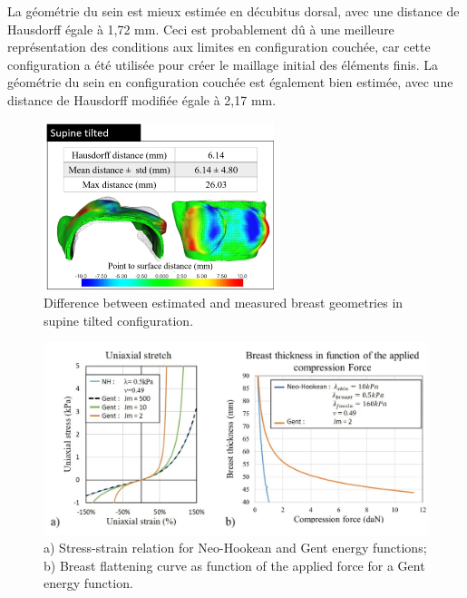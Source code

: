 La géométrie du sein est mieux estimée en décubitus dorsal, avec une distance de Hausdorff égale à 1,72 mm. Ceci est probablement dû à une meilleure représentation des conditions aux limites en configuration couchée, car cette configuration a été utilisée pour créer le maillage initial des éléments finis. La géométrie du sein en configuration couchée est également bien estimée, avec une distance de Hausdorff modifiée égale à 2,17 mm.

\begin{figure}[!h]
\centering
\includegraphics[width=0.6\textwidth,keepaspectratio]{figures/modelevaluation.png} 
\caption{Difference between estimated and measured breast geometries in supine tilted configuration.}\label{fig:modelevaluation}
\end{figure}

\begin{figure}[!h]
\centering
\includegraphics[width=1\textwidth,keepaspectratio]{figures/GentvsNeoStrain.jpg} 
\caption{a) Stress-strain relation for Neo-Hookean and Gent energy functions; b) Breast flattening curve as function of the applied force for a Gent energy function.}
\label{fig:GentvsNeoStrain}
\end{figure}


